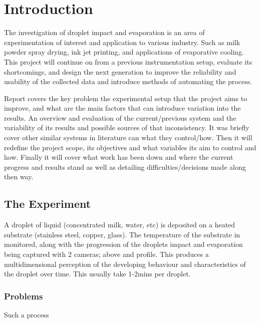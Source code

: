 \chapter{Introduction}\label{C:intro}
The investigation of droplet impact and evaporation is an area of experimentation of interest and application to various industry. Such as milk powder spray drying, ink jet printing, and applications of evaporative cooling. This project will continue on from a previous instrumentation setup, evaluate its shortcomings, and design the next generation to improve the reliability and usability of the collected data and introduce methods of automating the process. 

Report covers the key problem the experimental setup that the project aims to improve, and what are the main factors that can introduce variation into the results. An overview and evaluation of the current/previous system and the variability of its results and possible sources of that inconsistency. It was briefly cover other similar systems in literature can what they control/how. Then it will redefine the project scope, its objectives and what variables its aim to control and how. Finally it will cover what work has been down and where the current progress and results stand as well as detailing difficulties/decisions made along then way.  

\section*{The Experiment}

A droplet of liquid (concentrated milk, water, etc) is deposited on a heated substrate (stainless steel, copper, glass). The temperature of the substrate in monitored, along with the progression of the droplets impact and evaporation being captured with 2 cameras; above and profile. This produces a multidimensional perception of the developing behaviour and characteristics of the droplet over time. This usually take 1-2mins per droplet.

\subsection*{Problems}

Such a process